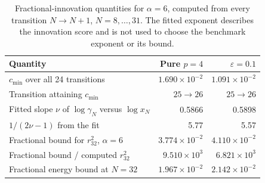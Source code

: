 \begin{table}[!htbp]
\centering
\small
\caption{Fractional-innovation quantities for \(\alpha=6\), computed from every transition \(N\to N+1\), \(N=8,\ldots,31\). The fitted exponent describes the innovation score and is not used to choose the benchmark exponent or its bound.}
\label{tab:fractional-p4}
\begin{tabularx}{\linewidth}{@{}Xrr@{}}
\toprule
Quantity & Pure \(p=4\) & \(\varepsilon=0.1\) \\
\midrule
\(c_{\min}\) over all 24 transitions & \(1.690\times10^{-2}\) & \(1.091\times10^{-2}\) \\
Transition attaining \(c_{\min}\) & \(25\to26\) & \(25\to26\) \\
Fitted slope \(\nu\) of \(\log\gamma_N\) versus \(\log x_N\) & 0.5866 & 0.5898 \\
\(1/(2\nu-1)\) from the fit & 5.77 & 5.57 \\
Fractional bound for \(r_{32}^2\), \(\alpha=6\) & \(3.774\times10^{-2}\) & \(4.110\times10^{-2}\) \\
Fractional bound / computed \(r_{32}^2\) & \(9.510\times10^{3}\) & \(6.821\times10^{3}\) \\
Fractional energy bound at \(N=32\) & \(1.967\times10^{-2}\) & \(2.142\times10^{-2}\) \\
\bottomrule
\end{tabularx}
\end{table}
